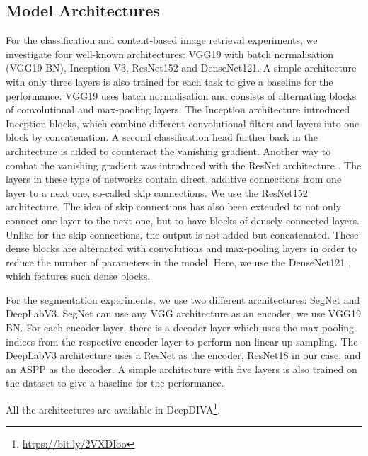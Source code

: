 \documentclass[journal]{IEEEtran}
\newcommand{\af}[1]{{\color{black}#1}}
\begin{document}
\subsection{Model Architectures}
\label{exp:architecture}


For the \af{classification and content-based image retrieval} experiments, we investigate four well-known architectures: VGG19 with batch normalisation (VGG19 BN), Inception V3, ResNet152 and DenseNet121.
A simple architecture with \af{only three} layers is also trained for each task to give a baseline for the performance.
VGG19 uses batch normalisation \cite{simonyan2014very} and consists of alternating blocks of convolutional and max-pooling layers. 
The Inception architecture \cite{Szegedy_2015_CVPR} introduced Inception blocks, which combine different convolutional filters and layers into one block by concatenation.
A second classification head further back in the architecture is added to counteract the vanishing gradient.
Another way to combat the vanishing gradient was introduced with the ResNet architecture \cite{DBLP:journals/corr/HeZRS15}. 
The layers in these type of networks contain direct, additive connections from one layer to a next one, so-called skip connections. 
We use the ResNet152 architecture. 
The idea of skip connections has also been extended to not only connect one layer to the next one, but to have blocks of densely-connected layers.
Unlike for the skip connections, the output is not added but concatenated.
These dense blocks are alternated with  convolutions and max-pooling layers in order to reduce the number of parameters in the model. 
Here, we use the DenseNet121 \cite{DBLP:journals/corr/HuangLW16a}, which features such dense blocks.

For the segmentation experiments, we use two different architectures: SegNet and DeepLabV3.
SegNet \cite{DBLP:journals/corr/BadrinarayananH15} can use any VGG architecture as an encoder, we use VGG19 BN. 
For each encoder layer, there is a decoder layer which uses the max-pooling indices from the respective encoder layer to perform non-linear up-sampling.
The DeepLabV3 architecture \cite{DBLP:journals/corr/ChenPSA17} uses a ResNet as the encoder, ResNet18 in our case, and an \ac{ASPP} as the decoder.
A simple architecture with five layers is also trained on the dataset to give a baseline for the performance.
 
All the architectures are available in DeepDIVA\footnote{\url{https://bit.ly/2VXDIoo}}.
\end{document}
